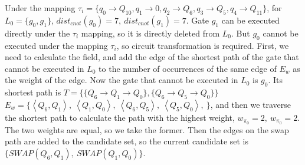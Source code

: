 \documentclass[runningheads]{llncs}
\begin{document}
\begin{example}
	Under the mapping $\tau_{i}=\{q_{0}\rightarrow  Q_{10},q_{1}\rightarrow  0,
q_{2}\rightarrow  Q_{6},q_{3}\rightarrow  Q_{5},q_{4}\rightarrow  Q_{11}\}$, 
for $L_{0}=\{g_{0},g_{1}\}$, $dist_{cnot}(g_{0})=7,\ dist_{cnot}(g_{1})=7$. 
Gate $g_{1}$ can be executed directly under the $\tau_{i}$ mapping, so it is directly deleted from $L_{0}$.
But $g_{0}$ cannot be executed under the mapping $\tau_{i}$, 
so circuit transformation is required. 
First, we need to calculate the field, 
and add the edge of the shortest path of the gate that cannot be executed in 
$L_{0}$ to the number of occurrences of the same edge of $E_{w}$ as the weight of the edge.
Now the gate that cannot be executed in $L_{0}$ is $g_{0}$. 
Its shortest path is $T=\{\{Q_{6}\rightarrow Q_{1} \rightarrow Q_{0} \},\{Q_{6}\rightarrow Q_{5} \rightarrow Q_{0} \}\}$
$E_{w}=\{\left \langle Q_{6},Q_{1}\right \rangle,\ \left \langle Q_{1},Q_{0}\right \rangle,\ 
\left \langle Q_{6},Q_{5}\right \rangle,\ \left \langle Q_{5},Q_{0}\right \rangle,\ 
\}$, and then we traverse the shortest path to calculate the path with the highest weight, 
$w_{\pi_{0}}=2, \ w_{\pi_{0}}=2$. The two weights are equal, so we take the former.
Then the edges on the swap path are added to the candidate set, 
so the current candidate set is $\{SWAP(Q_{6},Q_{1}),\ SWAP(Q_{1},Q_{0}) \}$.
\end{example}
\end{document}
